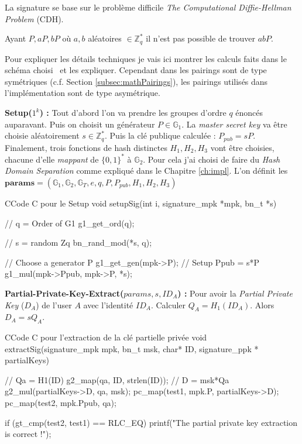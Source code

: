 La signature se base sur le problème difficile \textit{The Computational Diffie-Hellman Problem} (CDH). 

Ayant $P, aP, bP$ où $a,b$ aléatoires $\in \mathbb{Z}_q^*$ il n'est pas possible de trouver $abP$.

Pour expliquer les détails techniques je vais ici montrer les calculs faits dans le schéma choisi~\cite{DBLP:conf/acns/ZhangWXF06} et les expliquer. Cependant dans \cite{DBLP:conf/acns/ZhangWXF06} les pairings sont de type symétriques (c.f. Section \ref{subsec:mathPairings}), les pairings utilisés dans l'implémentation sont de type asymétrique.

\textbf{Setup($1^k $) :} Tout d'abord l'on va prendre les groupes d'ordre $q$ énoncés auparavant. Puis on choisit un générateur $P \in \mathbb{G}_1$. La \textit{master secret key} va être choisie aléatoirement $s \in \mathbb{Z}_q^*$. Puis la clé publique calculée : $P_{pub} = sP$. Finalement, trois fonctions de hash distinctes $H_1, H_2, H_3$ vont être choisies, chacune d'elle \textit{mappant} de $\{0,1\}^*$ à $\mathbb{G}_2$. Pour cela j'ai choisi de faire du \textit{Hash Domain Separation} comme expliqué dans le Chapitre \ref{ch:impl}. L'on définit les $\mathbf{params} = (\mathbb{G}_1,\mathbb{G}_2,\mathbb{G}_T,e,q,P,P_{pub},H_1,H_2,H_3)$

\begin{sourcebox}{C}{Code C pour le Setup}
	void setupSig(int i, signature_mpk *mpk, bn_t *s){
		// q = Order of G1
		g1_get_ord(q);
		
		// s = random Zq
		bn_rand_mod(*s, q);
		
		// Choose a generator P
		g1_get_gen(mpk->P);
		// Setup Ppub = s*P
		g1_mul(mpk->Ppub, mpk->P, *s);
	}
\end{sourcebox}

\textbf{Partial-Private-Key-Extract($params, s, ID_A$) :} Pour avoir la \textit{Partial Private Key} ($D_A$) de l'user $A$ avec l'identité $ID_A$. Calculer $Q_A = H_1(ID_A)$. Alors $D_A = sQ_A$.

\begin{sourcebox}{C}{Code C pour l'extraction de la clé partielle privée}
	void extractSig(signature_mpk mpk, bn_t msk, char* ID, signature_ppk * partialKeys) {
		// Qa = H1(ID)
		g2_map(qa, ID, strlen(ID));
		// D = msk*Qa
		g2_mul(partialKeys->D, qa, msk);
		pc_map(test1, mpk.P, partialKeys->D);
		pc_map(test2, mpk.Ppub, qa);
		
		if (gt_cmp(test2, test1) == RLC_EQ) {
			printf("The partial private key extraction is correct !\n");
		}
	}
\end{sourcebox}

